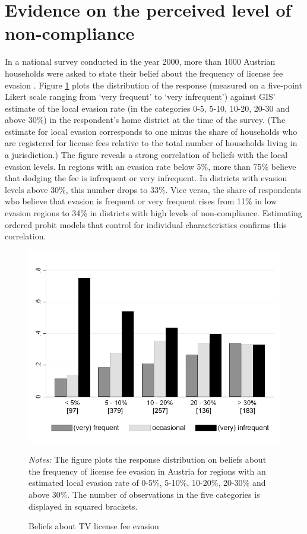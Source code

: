 \documentclass[preprint,inputenc=ansinew,doublespace,notheorems,wider]{jeea}
\begin{document}
\normalsize

\section{Evidence on the perceived level of non-compliance}\label{sec:perc_evasion}
\setcounter{figure}{0}
\setcounter{table}{0}

In a national survey conducted in the year 2000, more than 1000 Austrian households were asked to state their belief  about the frequency of license fee evasion \citep[see][]{traxler:09}. Figure \ref{belief} plots the distribution of the response (measured on a five-point Likert scale ranging from `very frequent' to `very infrequent') against GIS' estimate of the local evasion rate (in the categories 0-5, 5-10, 10-20, 20-30 and above 30\%) in the respondent's home district at the time of the survey. (The estimate for local evasion corresponds to one minus the share of households who are registered for license fees relative to the total number of households living in a jurisdiction.) The figure reveals a strong correlation of beliefs with the local evasion levels. In regions with an evasion rate below 5\%, more than 75\% believe that dodging the fee is infrequent or very infrequent. In districts with evasion levels above 30\%, this number drops to 33\%. Vice versa, the share of respondents who believe that evasion is frequent or very frequent rises from 11\% in low evasion regions to 34\% in districts with high levels of non-compliance. Estimating ordered probit models that control for individual characteristics confirms this correlation.

\begin{figure}[!h]
\includegraphics[width=12cm]{Belief2.jpg}
\caption{Beliefs about TV license fee evasion }\label{belief}
\centering \parbox{28pc}{\vspace{2mm}\footnotesize{\emph{Notes:} The figure plots the response distribution on beliefs about the frequency of license fee evasion in Austria for regions with an estimated local evasion rate of 0-5\%, 5-10\%, 10-20\%, 20-30\% and above 30\%. The number of observations in the five categories is displayed in squared brackets.}}
\end{figure}
\clearpage
\end{document}
